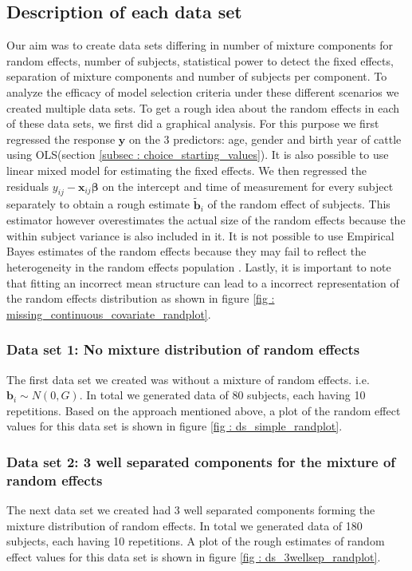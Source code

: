 \subsection{Description of each data set}
\label{subsec : ds_description}
Our aim was to create data sets differing in number of mixture components for random effects, number of subjects, statistical power to detect the fixed effects, separation of mixture components and number of subjects per component. To analyze the efficacy of model selection criteria under these different scenarios we created multiple data sets. To get a rough idea about the random effects in each of these data sets, we first did a graphical analysis. For this purpose we first regressed the response $\boldsymbol{y}$ on the 3 predictors: age, gender and birth year of cattle using OLS(section \ref{subsec : choice_starting_values}). It is also possible to use linear mixed model for estimating the fixed effects. We then regressed the residuals $y_{ij} - \boldsymbol{x}_{ij}\boldsymbol{\beta}$ on the intercept and time of measurement for every subject separately to obtain a rough estimate $\boldsymbol{\tilde{b}}_i$ of the random effect of subjects. This estimator however overestimates the actual size of the random effects because the within subject variance is also included in it. It is not possible to use Empirical Bayes estimates of the random effects because they may fail to reflect the heterogeneity in the random effects population \citep{verbeke_linear_1996}. Lastly, it is important to note that fitting an incorrect mean structure can lead to a incorrect representation of the random effects distribution as shown in figure \ref{fig : missing_continuous_covariate_randplot}.

\subsubsection{Data set 1: No mixture distribution of random effects}
\label{subsubsec : ds_simple}
The first data set we created was without a mixture of random effects. i.e. $\boldsymbol{b}_i \sim N(0, G)$. In total we generated data of 80 subjects, each having 10 repetitions. Based on the approach mentioned above, a plot of the random effect values for this data set is shown in figure \ref{fig : ds_simple_randplot}.

\subsubsection{Data set 2: 3 well separated components for the mixture of random effects}
\label{subsubsec : ds_3wellsep}
The next data set we created had 3 well separated components forming the mixture distribution of random effects. In total we generated data of 180 subjects, each having 10 repetitions. A plot of the rough estimates of random effect values for this data set is shown in figure \ref{fig : ds_3wellsep_randplot}.

